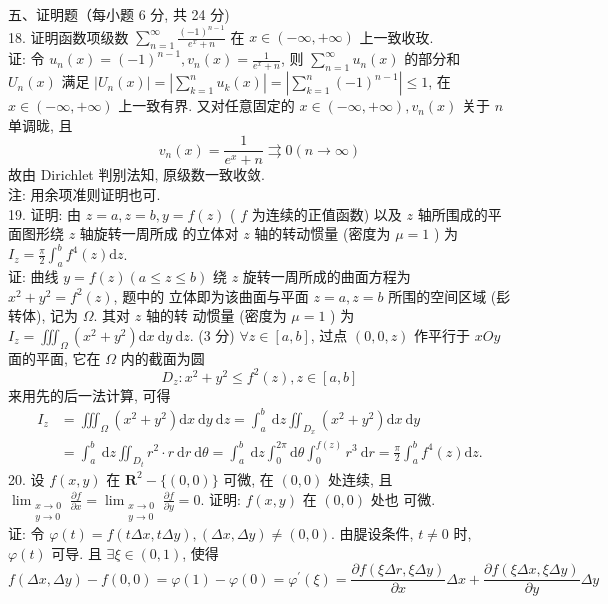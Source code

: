 \documentclass[a4paper,11pt,UTF8]{article}
\begin{document}
五、证明题（每小题 6 分, 共 24 分)\\
18. 证明函数项级数 $\sum_{n=1}^{\infty} \frac{(-1)^{n-1}}{e^x+n}$ 在 $x \in(-\infty,+\infty)$ 上一致收玫.\\
证: 令 $u_n(x)=(-1)^{n-1}, v_n(x)=\frac{1}{e^x+n}$, 则 $\sum_{n=1}^{\infty} u_n(x)$ 的部分和 $U_n(x)$ 满足
$\left|U_n(x)\right|=\left|\sum_{k=1}^n u_k(x)\right|=\left|\sum_{k=1}^n(-1)^{n-1}\right| \leq 1$, 在 $x \in(-\infty,+\infty)$ 上一致有界.
又对任意固定的 $x \in(-\infty,+\infty), v_n(x)$ 关于 $n$ 单调昽, 且
$$
v_n(x)=\frac{1}{e^x+n} \rightrightarrows 0(n \rightarrow \infty)
$$
故由 Dirichlet 判别法知, 原级数一致收敛.\\
注: 用余项准则证明也可.\\
19. 证明: 由 $z=a, z=b, y=f(z)$ ( $f$ 为连续的正值函数) 以及 $z$ 轴所围成的平面图形绕 $z$ 轴旋转一周所成 的立体对 $z$ 轴的转动惯量 (密度为 $\mu=1$ ) 为 $I_z=\frac{\pi}{2} \int_a^b f^4(z) \mathrm{d} z$.\\
证: 曲线 $y=f(z)(a \leq z \leq b)$ 绕 $z$ 旋转一周所成的曲面方程为 $x^2+y^2=f^2(z)$, 题中的 立体即为该曲面与平面 $z=a, z=b$ 所围的空间区域 (髟转体), 记为 $\Omega$. 其对 $z$ 轴的转 动惯量 (密度为 $\mu=1$ ) 为 $I_z=\iiint_{\Omega}\left(x^2+y^2\right) \mathrm{d} x \mathrm{~d} y \mathrm{~d} z$.
(3 分)
$\forall z \in[a, b]$, 过点 $(0,0, z)$ 作平行于 $x O y$ 面的平面, 它在 $\Omega$ 内的截面为圆
$$
D_z: x^2+y^2 \leq f^2(z), z \in[a, b]
$$
来用先的后一法计算, 可得
$$
\begin{aligned}
	I_z & =\iiint_{\Omega}\left(x^2+y^2\right) \mathrm{d} x \mathrm{~d} y \mathrm{~d} z=\int_a^b \mathrm{~d} z \iint_{D_x}\left(x^2+y^2\right) \mathrm{d} x \mathrm{~d} y \\
	& =\int_a^b \mathrm{~d} z \iint_{D_t} r^2 \cdot r \mathrm{~d} r \mathrm{~d} \theta=\int_a^b \mathrm{~d} z \int_0^{2 \pi} \mathrm{d} \theta \int_0^{f(z)} r^3 \mathrm{~d} r=\frac{\pi}{2} \int_a^b f^4(z) \mathrm{d} z .
\end{aligned}
$$
20. 设 $f(x, y)$ 在 $\mathbf{R}^2-\{(0,0)\}$ 可微, 在 $(0,0)$ 处连续, 且 $\lim _{\substack{x \rightarrow 0 \\ y \rightarrow 0}} \frac{\partial f}{\partial x}=\lim _{\substack{x \rightarrow 0 \\ y \rightarrow 0}} \frac{\partial f}{\partial y}=0$. 证明: $f(x, y)$ 在 $(0,0)$ 处也 可微.\\
证: 令 $\varphi(t)=f(t \Delta x, t \Delta y),(\Delta x, \Delta y) \neq(0,0)$. 由䐎设条件, $t \neq 0$ 时, $\varphi(t)$ 可导. 且
$\exists \xi \in(0,1)$, 使得
$$
f(\Delta x, \Delta y)-f(0,0)=\varphi(1)-\varphi(0)=\varphi^{\prime}(\xi)=\frac{\partial f(\xi \Delta r, \xi \Delta y)}{\partial x} \Delta x+\frac{\partial f(\xi \Delta x, \xi \Delta y)}{\partial y} \Delta y
$$
\end{document}
